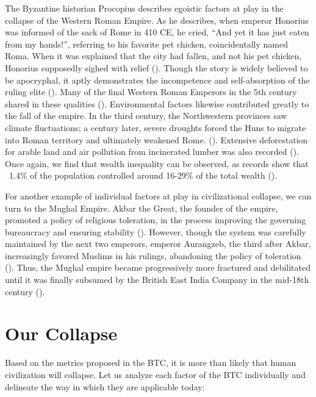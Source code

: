 \documentclass[12pt, a4paper, twoside]{article}
\begin{document}
The Byzantine historian Procopius describes egoistic factors at play in the collapse of the Western Roman Empire. As he describes, when emperor Honorius was informed of the sack of Rome in 410 CE, he cried, “And yet it has just eaten from my hands!”, referring to his favorite pet chicken, coincidentally named Roma. When it was explained that the city had fallen, and not his pet chicken, Honorius supposedly sighed with relief (\cite{procopius1916vandalic}). Though the story is widely believed to be apocryphal, it aptly demonstrates the incompetence and self-absorption of the ruling elite (\cite[p.\ 643]{gibbon1845decline}). Many of the final Western Roman Emperors in the 5th century shared in these qualities (\cite{britannica2024majorian}). Environmental factors likewise contributed greatly to the fall of the empire. In the third century, the Northwestern provinces saw climate fluctuations; a century later, severe droughts forced the Huns to migrate into Roman territory and ultimately weakened Rome. (\cite[pp.\ 190–191]{mccormick2012climate}). Extensive deforestation for arable land and air pollution from incinerated lumber was also recorded (\cites[p.\ 173]{harris2013ancient}[p.\ 171]{erskine2012companion}). Once again, we find that wealth inequality can be observed, as records show that ~1.4\% of the population controlled around 16-29\% of the total wealth (\cite[p.\ 76]{scheidel2009size}).

For another example of individual factors at play in civilizational collapse, we can turn to the Mughal Empire. Akbar the Great, the founder of the empire, promoted a policy of religious toleration, in the process improving the governing bureaucracy and ensuring stability (\cites{ballhatchet2024akbar}[p.\ 159]{stein2010historyindia}). However, though the system was carefully maintained by the next two emperors, emperor Aurangzeb, the third after Akbar, increasingly favored Muslims in his rulings, abandoning the policy of toleration (\cite[p.\ 183]{pletcher2010historyindia}). Thus, the Mughal empire became progressively more fractured and debilitated until it was finally subsumed by the British East India Company in the mid-18th century (\cites[p.\ 8]{blanton2020moral}{nationaltrust2024eastindia}). 

\section{Our Collapse}

Based on the metrics proposed in the BTC, it is more than likely that human civilization will collapse. Let us analyze each factor of the BTC individually and delineate the way in which they are applicable today: 
\end{document}
